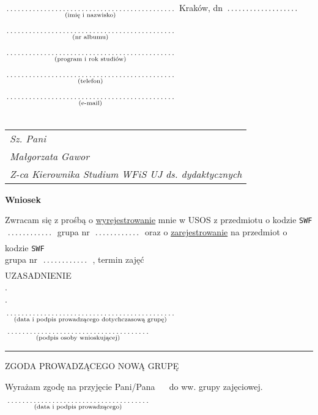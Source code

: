 \documentclass[a4paper,11pt]{article}
\newcommand{\fillField}[2]{
    $\underset{\text{#1}}{\parbox[t]{#2}{\dotfill}}$
}
\begin{document}
\noindent
\fillField{(imię i nazwisko)}{7cm} \hfill Kraków, dn\fillField{}{3cm} \\\\
\fillField{(nr albumu)}{7cm} \\\\
\fillField{(program i rok studiów)}{7cm} \\\\
\fillField{(telefon)}{7cm} \\\\
\fillField{(e-mail)}{7cm} \\\\

\phantom{a}\hfill
\begin{tabular}[c]{@{}l@{}}
\textit{Sz. Pani} \\
\textit{Małgorzata Gawor}\\
\textit{Z-ca Kierownika Studium WFiS UJ ds. dydaktycznych}
\end{tabular}

\vskip 1.5cm

\begin{center}
{\Large \textbf{Wniosek}}
\end{center}

\vskip 0.5cm

Zwracam się z prośbą o \underline{wyrejestrowanie} mnie w USOS z przedmiotu
o kodzie \texttt{SWF}\fillField{}{2cm} grupa nr \fillField{}{2cm} oraz o
\underline{zarejestrowanie} na przedmiot o kodzie \texttt{SWF}\dotfill\\
grupa nr \fillField{}{2cm}, termin zajęć \dotfill\\

\noindent
UZASADNIENIE \dotfill\\
.\dotfill\\
.\dotfill\\

\vskip 0.6cm

\fillField{(data i podpis prowadzącego dotychczasową grupę)}{7cm} \hspace{\fill}
\fillField{(podpis osoby wnioskującej)}{6cm}
\vskip 1.0cm

\noindent\rule{\textwidth}{0.5pt}

\begin{center}
ZGODA PROWADZĄCEGO NOWĄ GRUPĘ
\end{center}

\noindent
Wyrażam zgodę na przyjęcie Pani/Pana ~\dotfill~ do ww. grupy zajęciowej.

\vskip 1.5cm

\hspace{\fill} \fillField{(data i podpis prowadzącego)}{6cm} \hspace{2.0cm}
\end{document}
